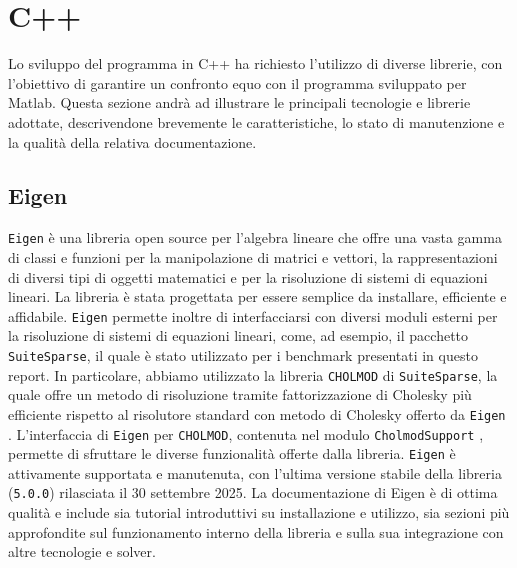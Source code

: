 \section{C++}
Lo sviluppo del programma in C++ ha richiesto l'utilizzo di diverse librerie, con l'obiettivo di garantire un confronto equo 
con il programma sviluppato per Matlab. 
Questa sezione andrà ad illustrare le principali tecnologie e librerie adottate, 
descrivendone brevemente le caratteristiche, lo stato di manutenzione e la qualità della relativa documentazione.
\subsection{Eigen}
\texttt{Eigen} è una libreria open source per l'algebra lineare che offre una vasta gamma di classi e funzioni per la manipolazione di matrici e vettori, la rappresentazioni di diversi
tipi di oggetti matematici e per la risoluzione di sistemi di equazioni lineari.
La libreria è stata progettata per essere semplice da installare, efficiente e affidabile.
\texttt{Eigen} permette inoltre di interfacciarsi con diversi moduli esterni per la risoluzione  di sistemi di equazioni lineari, come, ad esempio, il pacchetto \texttt{SuiteSparse},
il quale è stato utilizzato per i benchmark presentati in questo report.
In particolare, abbiamo utilizzato la libreria \texttt{CHOLMOD} di \texttt{SuiteSparse}, la quale offre un metodo di risoluzione tramite fattorizzazione di Cholesky più efficiente rispetto al risolutore standard con metodo di Cholesky offerto da \texttt{Eigen} \cite{eigen_simpicial_llt}. 
L'interfaccia di \texttt{Eigen} per \texttt{CHOLMOD}, contenuta nel modulo \texttt{CholmodSupport} \cite{cholmod_eigen}, permette di sfruttare le diverse funzionalità offerte dalla libreria.
\texttt{Eigen} è attivamente supportata e manutenuta, con l'ultima versione stabile della libreria (\texttt{5.0.0}) rilasciata il 30 settembre 2025.
La documentazione di Eigen è di ottima qualità e include sia tutorial introduttivi su installazione e utilizzo, sia sezioni più approfondite 
sul funzionamento interno della libreria e sulla sua integrazione con altre tecnologie e solver.
